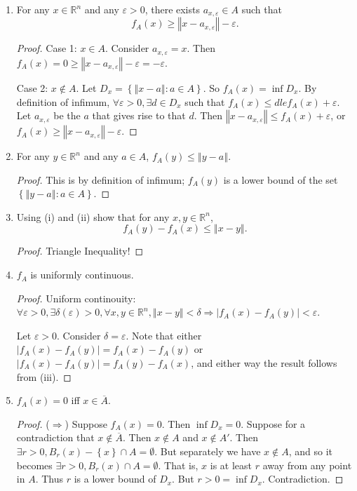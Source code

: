 \documentclass{article}
\newcommand{\R}{\mathbb{R}}
\newcommand{\abs}[1]{\left| #1 \right|}
\newcommand{\set}[1]{\left\{ #1 \right\}}
\newcommand{\norm}[1]{\left\Vert #1 \right\Vert}
\newcommand{\ol}[1]{\overline{#1}}
\begin{document}
\renewcommand{\labelenumi}{(\roman{enumi})}
\begin{enumerate}
    \item 
    For any $x \in \R^n$ and any $\varepsilon > 0$, there exists $a_{x,\varepsilon} \in A$ such that
    $$f_A(x) \ge \norm{x - a_{x,\varepsilon}} - \varepsilon.$$
    \begin{proof}
        Case 1: $x \in A$. Consider $a_{x,\varepsilon} = x$. Then $f_A(x) = 0 \ge \norm{x - a_{x,\varepsilon}} - \varepsilon = -\varepsilon$.

        Case 2: $x \notin A$. Let $D_x = \set{\norm{x - a} : a \in A}$. So $f_A(x) = \inf D_x$. By definition of infimum, $\forall \varepsilon > 0, \exists d \in D_x$ such that $f_A(x) \le d le f_A(x) + \varepsilon$. Let $a_{x, \varepsilon}$ be the $a$ that gives rise to that $d$. Then $\norm{x - a_{x,\varepsilon}} \le f_A(x) + \varepsilon$, or $f_A(x) \ge \norm{x - a_{x,\varepsilon}} - \varepsilon$.
    \end{proof}


    \item 
    For any $y \in \R^n$ and any $a \in A$, $f_A(y) \le \norm{y - a}$.
    \begin{proof}
        This is by definition of infimum; $f_A(y)$ is a lower bound of the set $\set{\norm{y - a} : a \in A}$.
    \end{proof}


    \item 
    Using (i) and (ii) show that for any $x, y \in \R^n$,
    $$f_A(y) - f_A(x) \le \norm{x - y}.$$
    \begin{proof}
        Triangle Inequality!
    \end{proof}


    \item 
    $f_A$ is uniformly continuous.
    \begin{proof}
        Uniform continouity: $\forall \varepsilon > 0, \exists \delta(\varepsilon) > 0, \forall x, y \in \R^n, \norm{x - y} < \delta \Rightarrow \abs{f_A(x) - f_A(y)} < \varepsilon$. 

        Let $\varepsilon > 0$. Consider $\delta = \varepsilon$. Note that either $\abs{f_A(x) - f_A(y)} = f_A(x) - f_A(y)$ or $\abs{f_A(x) - f_A(y)} = f_A(y) - f_A(x)$, and either way the result follows from (iii).
    \end{proof}


    \item 
    $f_A(x) = 0$ iff $x \in \ol{A}$.
    \begin{proof}
        ($\Longrightarrow$) Suppose $f_A(x) = 0$. Then $\inf D_x = 0$. Suppose for a contradiction that $x \notin \ol{A}$. Then $x \notin A$ and $x \notin A'$. Then $\exists r > 0, B_r(x) - \set{x} \cap A = \emptyset$. But separately we have $x \notin A$, and so it becomes $\exists r > 0, B_r(x) \cap A = \emptyset$. That is, $x$ is at least $r$ away from any point in $A$. Thus $r$ is a lower bound of $D_x$. But $r > 0 = \inf D_x$. Contradiction.


\end{proof}
\end{enumerate}
\end{document}
